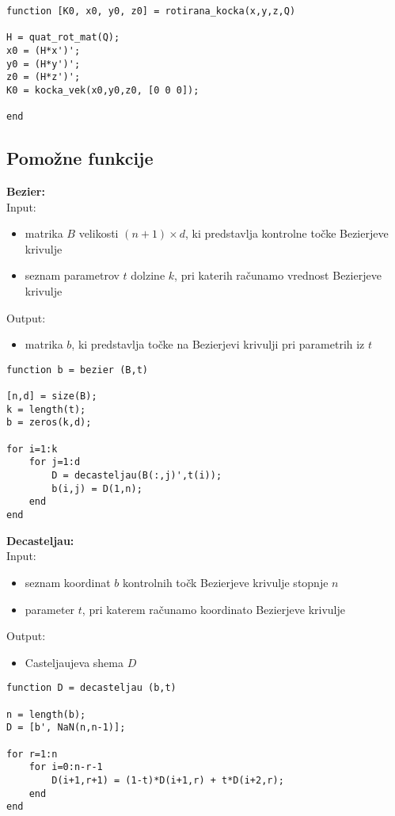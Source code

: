 \documentclass[12pt,a4paper,twoside]{article}
\theoremstyle{definition} %
\theoremstyle{plain} %
\numberwithin{equation}{section}  %
\begin{document}
\begin{lstlisting}[caption = {\color{green} rotirana\_kocka}]
function [K0, x0, y0, z0] = rotirana_kocka(x,y,z,Q)

H = quat_rot_mat(Q);
x0 = (H*x')';
y0 = (H*y')'; 
z0 = (H*z')';
K0 = kocka_vek(x0,y0,z0, [0 0 0]);

end
\end{lstlisting}

\newpage

\subsection{Pomožne funkcije}

\textbf{Bezier:}\\
Input:
\begin{itemize}
\item matrika $B$ velikosti $(n+1) \times d$, ki predstavlja kontrolne točke Bezierjeve krivulje
\item seznam parametrov $t$ dolzine $k$, pri katerih računamo vrednost Bezierjeve krivulje
\end{itemize}
Output:
\begin{itemize}
\item matrika $b$, ki predstavlja točke na Bezierjevi krivulji pri parametrih iz $t$
\end{itemize}

\begin{lstlisting}[caption = {bezier}]
function b = bezier (B,t)

[n,d] = size(B);
k = length(t);
b = zeros(k,d);

for i=1:k
    for j=1:d
        D = decasteljau(B(:,j)',t(i));
        b(i,j) = D(1,n);
    end
end
\end{lstlisting}

\vspace{1cm}
\textbf{Decasteljau:}\\
Input:
\begin{itemize}
\item seznam koordinat $b$ kontrolnih točk Bezierjeve krivulje stopnje $n$
\item parameter $t$, pri katerem računamo koordinato Bezierjeve krivulje
\end{itemize}
Output:
\begin{itemize}
\item Casteljaujeva shema $D$
\end{itemize}

\begin{lstlisting}[caption = {decasteljau}]
function D = decasteljau (b,t) 

n = length(b);
D = [b', NaN(n,n-1)];

for r=1:n
    for i=0:n-r-1
        D(i+1,r+1) = (1-t)*D(i+1,r) + t*D(i+2,r);
    end
end
\end{lstlisting}
\end{document}
